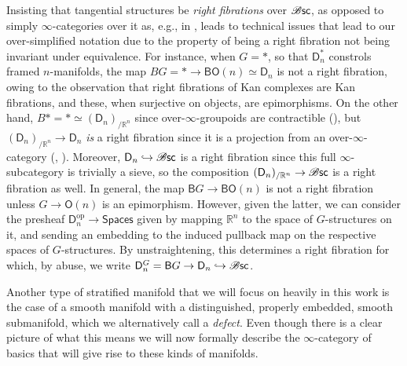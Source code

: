 \documentclass[../text]{subfiles}
\begin{document}
\begin{remark}
    Insisting that tangential structures be \emph{right fibrations} over $\mathscr{B} \mathsf{sc}$, as opposed to simply $\infty$-categories over it as, e.g., in \cite{ayala2020factorization}, leads to technical issues that lead to our over-simplified notation due to the property of being a right fibration not being invariant under equivalence. For instance, when $G=\ast$, so that $\mathsf{D}^\ast_n$ constrols framed $n$-manifolds, the map $BG=\ast\to \mathsf{BO}(n)\simeq\mathsf{D}_n$ is not a right fibration, owing to the observation that right fibrations of Kan complexes are Kan fibrations, and these, when surjective on objects, are epimorphisms. On the other hand, $B\ast=\ast\simeq (\mathsf{D}_n)_{/\mathbb{R}^n}$ since over-$\infty$-groupoids are contractible (\cite[018Y]{lurie_kerodon}), but $(\mathsf{D}_n)_{/\mathbb{R}^n}\to \mathsf{D}_n$ \emph{is} a right fibration since it is a projection from an over-$\infty$-category (\cite[018F]{lurie_kerodon}, \cite{joyal}). Moreover, $\mathsf{D}_n\hookrightarrow \mathscr{B} \mathsf{sc}$ is a right fibration since this full $\infty$-subcategory is trivially a sieve, so the composition $(\mathsf{D}_n)_{/\mathbb{R}^n}\to \mathscr{B} \mathsf{sc}$ is a right fibration as well. In general, the map $\mathsf{B}G\to \mathsf{BO}(n)$ is not a right fibration unless $G\to\mathsf{O}(n)$ is an epimorphism. However, given the latter, we can consider the presheaf $\mathsf{D}_n^{\text{op}}\to\mathsf{Spaces}$ given by mapping $\mathbb{R}^n$ to the space of $G$-structures on it, and sending an embedding to the induced pullback map on the respective spaces of $G$-structures. By unstraightening, this determines a right fibration for which, by abuse, we write $\mathsf{D}^G_n=\mathsf{B}G\to \mathsf{D}_n\hookrightarrow\mathscr{B} \mathsf{sc}$.
\end{remark}

Another type of stratified manifold that we will focus on heavily in this work is the case of a smooth manifold with a distinguished, properly embedded, smooth submanifold, which we alternatively call a \emph{defect}. Even though there is a clear picture of what this means we will now formally describe the $\infty$-category of basics that will give rise to these kinds of manifolds.
\end{document}
